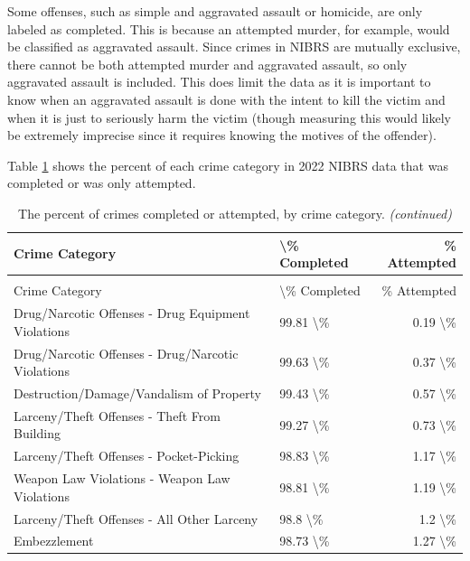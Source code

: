 \documentclass[
]{krantz}
\begin{document}
Some offenses, such as simple and aggravated assault or
homicide, are only labeled as completed. This is because an
attempted murder, for example, would be classified as
aggravated assault. Since crimes in NIBRS are mutually
exclusive, there cannot be both attempted murder and
aggravated assault, so only aggravated assault is included.
This does limit the data as it is important to know when an
aggravated assault is done with the intent to kill the
victim and when it is just to seriously harm the victim
(though measuring this would likely be extremely imprecise
since it requires knowing the motives of the offender).

Table \ref{tab:offensesCompleted} shows the percent of each
crime category in 2022 NIBRS data that was completed or was
only attempted.

\begin{longtable}[t]{l|l|r}
\caption{\label{tab:offensesCompleted}The percent of crimes completed or attempted, by crime category.}\\
\hline
Crime Category & \textbackslash{}\% Completed & \% Attempted\\
\hline
\endfirsthead
\caption[]{\label{tab:offensesCompleted}The percent of crimes completed or attempted, by crime category. \textit{(continued)}}\\
\hline
Crime Category & \textbackslash{}\% Completed & \% Attempted\\
\hline
\endhead
Drug/Narcotic Offenses - Drug Equipment Violations & 99.81 \textbackslash{}\% & 0.19 \textbackslash{}\%\\
\hline
Drug/Narcotic Offenses - Drug/Narcotic Violations & 99.63 \textbackslash{}\% & 0.37 \textbackslash{}\%\\
\hline
Destruction/Damage/Vandalism of Property & 99.43 \textbackslash{}\% & 0.57 \textbackslash{}\%\\
\hline
Larceny/Theft Offenses - Theft From Building & 99.27 \textbackslash{}\% & 0.73 \textbackslash{}\%\\
\hline
Larceny/Theft Offenses - Pocket-Picking & 98.83 \textbackslash{}\% & 1.17 \textbackslash{}\%\\
\hline
Weapon Law Violations - Weapon Law Violations & 98.81 \textbackslash{}\% & 1.19 \textbackslash{}\%\\
\hline
Larceny/Theft Offenses - All Other Larceny & 98.8 \textbackslash{}\% & 1.2 \textbackslash{}\%\\
\hline
Embezzlement & 98.73 \textbackslash{}\% & 1.27 \textbackslash{}\%\\

\end{longtable}
\end{document}

